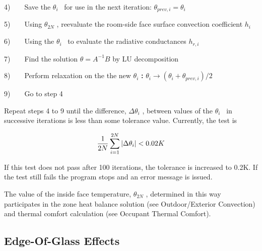 4)~~~~Save the \({\theta_i}\) ~for use in the next iteration: \({\theta_{prev,i}} = {\theta_i}\)

5)~~~~Using \({\theta_{2N}}\) , reevaluate the room-side face surface convection coefficient \({h_i}\)

6)~~~~Using the \({\theta_i}\) ~to evaluate the radiative conductances \({h_{r,i}}\)

7)~~~~Find the solution \(\theta = {A^{ - 1}}B\) by LU decomposition

8)~~~~Perform relaxation on the the new \({\theta_i}\) \textbf{:} \({\theta_i} \to \left( {{\theta_i} + {\theta_{prev,i}}} \right)/2\)

9)~~~~Go to step 4

Repeat steps 4 to 9 until the difference, \(\Delta {\theta_i}\) , between values of the \({\theta_i}\) ~in successive iterations is less than some tolerance value. Currently, the test is

\begin{equation}
\frac{1}{{2N}}\sum\limits_{i = 1}^{2N} {|\Delta {\theta_i}|{\rm{ }} < 0.02K}
\end{equation}

If this test does not pass after 100 iterations, the tolerance is increased to 0.2K. If the test still fails the program stops and an error message is issued.

The value of the inside face temperature, \({\theta_{2N}}\) , determined in this way participates in the zone heat balance solution (see Outdoor/Exterior Convection) and thermal comfort calculation (see Occupant Thermal Comfort).

\subsection{Edge-Of-Glass Effects}\label{edge-of-glass-effects}

